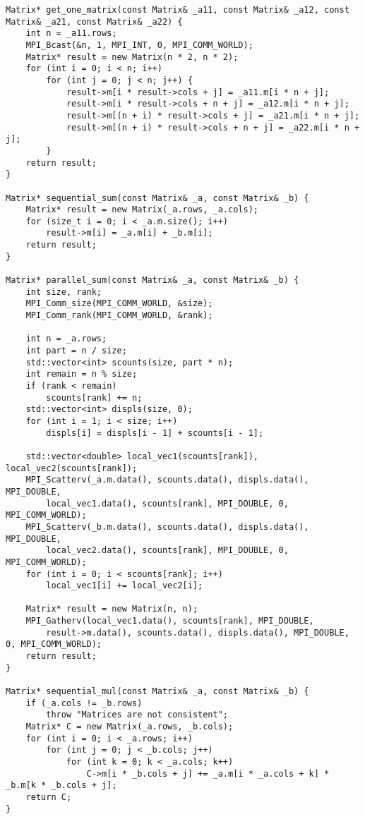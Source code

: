 \documentclass{report}
\begin{document}
\begin{lstlisting}
Matrix* get_one_matrix(const Matrix& _a11, const Matrix& _a12, const Matrix& _a21, const Matrix& _a22) {
    int n = _a11.rows;
    MPI_Bcast(&n, 1, MPI_INT, 0, MPI_COMM_WORLD);
    Matrix* result = new Matrix(n * 2, n * 2);
    for (int i = 0; i < n; i++)
        for (int j = 0; j < n; j++) {
            result->m[i * result->cols + j] = _a11.m[i * n + j];
            result->m[i * result->cols + n + j] = _a12.m[i * n + j];
            result->m[(n + i) * result->cols + j] = _a21.m[i * n + j];
            result->m[(n + i) * result->cols + n + j] = _a22.m[i * n + j];
        }
    return result;
}

Matrix* sequential_sum(const Matrix& _a, const Matrix& _b) {
    Matrix* result = new Matrix(_a.rows, _a.cols);
    for (size_t i = 0; i < _a.m.size(); i++)
        result->m[i] = _a.m[i] + _b.m[i];
    return result;
}

Matrix* parallel_sum(const Matrix& _a, const Matrix& _b) {
    int size, rank;
    MPI_Comm_size(MPI_COMM_WORLD, &size);
    MPI_Comm_rank(MPI_COMM_WORLD, &rank);

    int n = _a.rows;
    int part = n / size;
    std::vector<int> scounts(size, part * n);
    int remain = n % size;
    if (rank < remain)
        scounts[rank] += n;
    std::vector<int> displs(size, 0);
    for (int i = 1; i < size; i++)
        displs[i] = displs[i - 1] + scounts[i - 1];

    std::vector<double> local_vec1(scounts[rank]), local_vec2(scounts[rank]);
    MPI_Scatterv(_a.m.data(), scounts.data(), displs.data(), MPI_DOUBLE,
        local_vec1.data(), scounts[rank], MPI_DOUBLE, 0, MPI_COMM_WORLD);
    MPI_Scatterv(_b.m.data(), scounts.data(), displs.data(), MPI_DOUBLE,
        local_vec2.data(), scounts[rank], MPI_DOUBLE, 0, MPI_COMM_WORLD);
    for (int i = 0; i < scounts[rank]; i++)
        local_vec1[i] += local_vec2[i];

    Matrix* result = new Matrix(n, n);
    MPI_Gatherv(local_vec1.data(), scounts[rank], MPI_DOUBLE,
        result->m.data(), scounts.data(), displs.data(), MPI_DOUBLE, 0, MPI_COMM_WORLD);
    return result;
}

Matrix* sequential_mul(const Matrix& _a, const Matrix& _b) {
    if (_a.cols != _b.rows)
        throw "Matrices are not consistent";
    Matrix* C = new Matrix(_a.rows, _b.cols);
    for (int i = 0; i < _a.rows; i++)
        for (int j = 0; j < _b.cols; j++)
            for (int k = 0; k < _a.cols; k++)
                C->m[i * _b.cols + j] += _a.m[i * _a.cols + k] * _b.m[k * _b.cols + j];
    return C;
}


\end{lstlisting}
\end{document}
